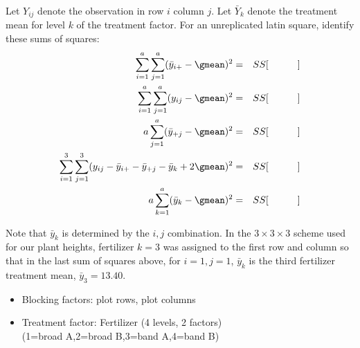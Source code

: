 \newpage
{}
\noindent
Let $Y_{ij}$ denote the observation in row $i$ column $j$.
Let $\bar{Y}_k$ denote the treatment mean for level $k$ of the treatment
factor.  For an unreplicated latin square, identify these sums of squares:
\begin{eqnarray*}
\sum_{i=1}^a\sum_{j=1}^a (\bar{y}_{i+} - \gmean)^2 & = & SS[\ \ \ \ \ \ \ \ \ ] \\
\sum_{i=1}^a\sum_{j=1}^a (y_{ij} - \gmean)^2 & = & SS[\ \ \ \ \ \ \ \ \ ] \\
a\sum_{j=1}^a (\bar{y}_{+j} - \gmean)^2 & = & SS[\ \ \ \ \ \ \ \ \ ]  \\
\sum_{i=1}^3\sum_{j=1}^3 (y_{ij} - \bar{y}_{i+} - \bar{y}_{+j} - \bar{y}_k + 2\gmean)^2 & = & SS[\ \ \ \ \ \ \ \ \ ] \\
a \sum_{k=1}^a (\bar{y}_{k} - \gmean)^2 & = & SS[\ \ \ \ \ \ \ \ \ ] \\
\end{eqnarray*}

\vspace{0.5in}
\noindent
Note that %
$\bar{y}_k$ is determined by the $i,j$
combination.  In the $3\times 3\times 3$ scheme used for our plant heights,
fertilizer $k=3$ was assigned to the first row and column so that in
the last sum of squares above, for $i=1,j=1$, $\bar{y}_k$ is the third
fertilizer treatment mean, $\bar{y}_3=13.40$.
\newpage
{}
\noindent
\begin{itemize}
\item
Blocking factors: plot rows, plot columns
\item
Treatment factor: Fertilizer (4 levels, 2 factors)\\
(1=broad A,2=broad B,3=band A,4=band B)
\end{itemize}


